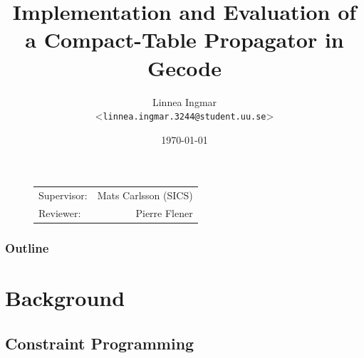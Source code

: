 \documentclass{beamer}
\title{Implementation and Evaluation of a Compact-Table Propagator in Gecode}
\author[Linnea Ingmar | \emph{linnea.ingmar.3244@student.uu.se}] %
{Linnea Ingmar \\ <\texttt{linnea.ingmar.3244@student.uu.se}>}
\institute[Dept. of Information Technology] %
{
  The ASTRA Group\\ on Combinatorial Optimisation \\
  Uppsala University
}
\date[\today] %
{\today}
\begin{document}
\begin{frame}[plain] %
  \titlepage
  
  \begin{figure}
    \begin{flushright}
        \begin{tabular}[t,right]{lr}
          Supervisor: & Mats Carlsson (SICS) \\
          Reviewer:   & Pierre Flener
        \end{tabular}
      \end{flushright}
  \end{figure}

\end{frame}

\begin{frame}
    \frametitle{Outline}
    \tableofcontents[currentsection]
\end{frame}

\section{Background}

\subsection{Constraint Programming}
\end{document}

